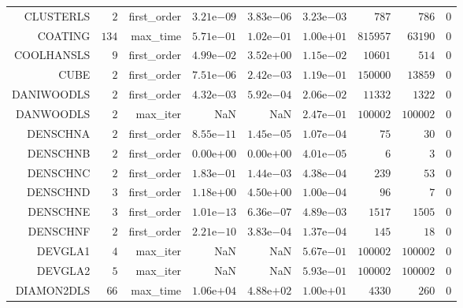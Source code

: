 \begin{longtable}{rrrrrrrrr}
CLUSTERLS & \(     2\) & first\_order & \( 3.21\)e\(-09\) & \( 3.83\)e\(-06\) & \( 3.23\)e\(-03\) & \(   787\) & \(   786\) & \(     0\) \\
COATING & \(   134\) & max\_time & \( 5.71\)e\(-01\) & \( 1.02\)e\(-01\) & \( 1.00\)e\(+01\) & \(815957\) & \( 63190\) & \(     0\) \\
COOLHANSLS & \(     9\) & first\_order & \( 4.99\)e\(-02\) & \( 3.52\)e\(+00\) & \( 1.15\)e\(-02\) & \( 10601\) & \(   514\) & \(     0\) \\
CUBE & \(     2\) & first\_order & \( 7.51\)e\(-06\) & \( 2.42\)e\(-03\) & \( 1.19\)e\(-01\) & \(150000\) & \( 13859\) & \(     0\) \\
DANIWOODLS & \(     2\) & first\_order & \( 4.32\)e\(-03\) & \( 5.92\)e\(-04\) & \( 2.06\)e\(-02\) & \( 11332\) & \(  1322\) & \(     0\) \\
DANWOODLS & \(     2\) & max\_iter &       NaN &       NaN & \( 2.47\)e\(-01\) & \(100002\) & \(100002\) & \(     0\) \\
DENSCHNA & \(     2\) & first\_order & \( 8.55\)e\(-11\) & \( 1.45\)e\(-05\) & \( 1.07\)e\(-04\) & \(    75\) & \(    30\) & \(     0\) \\
DENSCHNB & \(     2\) & first\_order & \( 0.00\)e\(+00\) & \( 0.00\)e\(+00\) & \( 4.01\)e\(-05\) & \(     6\) & \(     3\) & \(     0\) \\
DENSCHNC & \(     2\) & first\_order & \( 1.83\)e\(-01\) & \( 1.44\)e\(-03\) & \( 4.38\)e\(-04\) & \(   239\) & \(    53\) & \(     0\) \\
DENSCHND & \(     3\) & first\_order & \( 1.18\)e\(+00\) & \( 4.50\)e\(+00\) & \( 1.00\)e\(-04\) & \(    96\) & \(     7\) & \(     0\) \\
DENSCHNE & \(     3\) & first\_order & \( 1.01\)e\(-13\) & \( 6.36\)e\(-07\) & \( 4.89\)e\(-03\) & \(  1517\) & \(  1505\) & \(     0\) \\
DENSCHNF & \(     2\) & first\_order & \( 2.21\)e\(-10\) & \( 3.83\)e\(-04\) & \( 1.37\)e\(-04\) & \(   145\) & \(    18\) & \(     0\) \\
DEVGLA1 & \(     4\) & max\_iter &       NaN &       NaN & \( 5.67\)e\(-01\) & \(100002\) & \(100002\) & \(     0\) \\
DEVGLA2 & \(     5\) & max\_iter &       NaN &       NaN & \( 5.93\)e\(-01\) & \(100002\) & \(100002\) & \(     0\) \\
DIAMON2DLS & \(    66\) & max\_time & \( 1.06\)e\(+04\) & \( 4.88\)e\(+02\) & \( 1.00\)e\(+01\) & \(  4330\) & \(   260\) & \(     0\) \\

\end{longtable}
